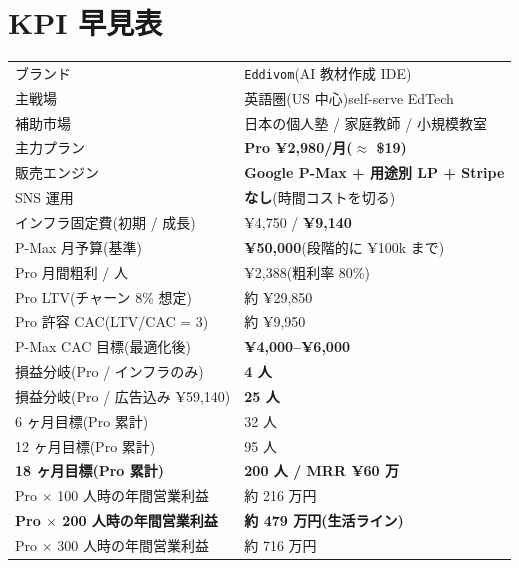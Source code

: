 \documentclass{article}
\newcommand{\hl}[1]{\textcolor{cAlert}{\textbf{#1}}}
\begin{document}
\section*{KPI 早見表}
\begin{center}
\small
\renewcommand{\arraystretch}{1.25}
\begin{tabular}{ll}
\toprule
ブランド                                       & \texttt{Eddivom}(AI 教材作成 IDE) \\
主戦場                                         & 英語圏(US 中心)self-serve EdTech \\
補助市場                                       & 日本の個人塾 / 家庭教師 / 小規模教室 \\
主力プラン                                     & \hl{Pro ¥2,980/月($\approx$ \$19)} \\
販売エンジン                                   & \hl{Google P-Max + 用途別 LP + Stripe} \\
SNS 運用                                       & \hl{なし}(時間コストを切る) \\
インフラ固定費(初期 / 成長)                  & ¥4,750 / \hl{¥9,140} \\
P-Max 月予算(基準)                           & \hl{¥50,000}(段階的に ¥100k まで) \\
Pro 月間粗利 / 人                              & ¥2,388(粗利率 80\%) \\
Pro LTV(チャーン 8\% 想定)                   & 約 ¥29,850 \\
Pro 許容 CAC(LTV/CAC = 3)                    & 約 ¥9,950 \\
P-Max CAC 目標(最適化後)                     & \hl{¥4,000--¥6,000} \\
損益分岐(Pro / インフラのみ)                 & \hl{4 人} \\
損益分岐(Pro / 広告込み ¥59,140)             & \hl{25 人} \\
6 ヶ月目標(Pro 累計)                         & 32 人 \\
12 ヶ月目標(Pro 累計)                        & 95 人 \\
\hl{18 ヶ月目標(Pro 累計)}                   & \hl{200 人 / MRR ¥60 万} \\
Pro $\times$ 100 人時の年間営業利益            & 約 216 万円 \\
\hl{Pro $\times$ 200 人時の年間営業利益}       & \hl{約 479 万円(生活ライン)} \\
Pro $\times$ 300 人時の年間営業利益            & 約 716 万円 \\
\bottomrule
\end{tabular}
\end{center}
\end{document}
